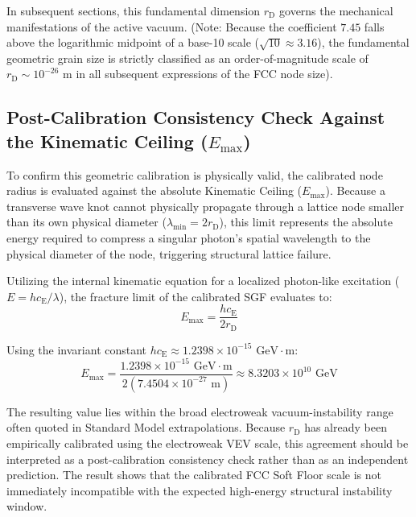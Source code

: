 In subsequent sections, this fundamental dimension $r_{\mathrm{D}}$ governs the mechanical manifestations of the active vacuum. (Note: Because the coefficient $7.45$ falls above the logarithmic midpoint of a base-10 scale ($\sqrt{10} \approx 3.16$), the fundamental geometric grain size is strictly classified as an order-of-magnitude scale of $r_{\mathrm{D}} \sim 10^{-26}$ m in all subsequent expressions of the FCC node size).

\subsection{Post-Calibration Consistency Check Against the Kinematic Ceiling \texorpdfstring{($E_{\mathrm{max}}$)}{E\_max}}
To confirm this geometric calibration is physically valid, the calibrated node radius is evaluated against the absolute Kinematic Ceiling ($E_{\mathrm{max}}$). Because a transverse wave knot cannot physically propagate through a lattice node smaller than its own physical diameter ($\lambda_{\mathrm{min}} = 2r_{\mathrm{D}}$), this limit represents the absolute energy required to compress a singular photon's spatial wavelength to the physical diameter of the node, triggering structural lattice failure.

Utilizing the internal kinematic equation for a localized photon-like excitation ($E = hc_{\mathrm{E}}/\lambda$), the fracture limit of the calibrated SGF evaluates to:
\begin{equation}
    E_{\mathrm{max}} = \frac{hc_{\mathrm{E}}}{2r_{\mathrm{D}}}
\end{equation}

Using the invariant constant $hc_{\mathrm{E}} \approx 1.2398 \times 10^{-15} \text{ GeV}\cdot\text{m}$:
\begin{equation}
    E_{\mathrm{max}} = \frac{1.2398 \times 10^{-15} \text{ GeV}\cdot\text{m}}{2(7.4504 \times 10^{-27} \text{ m})} \approx 8.3203 \times 10^{10} \text{ GeV}
\end{equation}

The resulting value lies within the broad electroweak vacuum-instability range often quoted in Standard Model extrapolations. Because $r_{\mathrm{D}}$ has already been empirically calibrated using the electroweak VEV scale, this agreement should be interpreted as a post-calibration consistency check rather than as an independent prediction. The result shows that the calibrated FCC Soft Floor scale is not immediately incompatible with the expected high-energy structural instability window.

